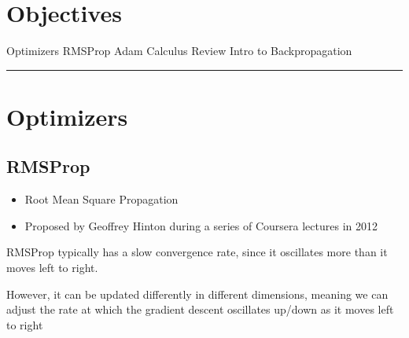 \pgfplotsset{compat=1.18}

\section*{Objectives}
\begin{outline}
    \1 Optimizers
    \2 RMSProp
    \2 Adam
    \1 Calculus Review
    \1 Intro to Backpropagation
\end{outline}

\rule[0.0051in]{\textwidth}{0.00025in}
\section{Optimizers}
\subsection{RMSProp}

\begin{itemize}
    \item Root Mean Square Propagation
    \item Proposed by Geoffrey Hinton during a series of Coursera lectures in 2012
\end{itemize}
RMSProp typically has a slow convergence rate, since it oscillates more than it moves left to right.

However, it can be updated differently in different dimensions, meaning we can adjust the rate at which the gradient descent oscillates up/down as it moves left to right

\begin{center}
\end{center}


